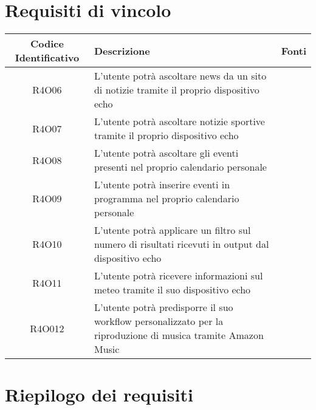 \section{Requisiti di vincolo}
\begin{tabularx}{\textwidth}{|c|X|X|}
	\hline
	\textbf{Codice Identificativo}& \textbf{Descrizione} & \textbf{Fonti}\\
	\hline	
	\endhead
	R4O06 & L'utente potrà ascoltare news da un sito di notizie tramite il proprio dispositivo echo &\\
	\hline
	R4O07 & L'utente potrà ascoltare notizie sportive tramite il proprio dispositivo echo  &\\
	\hline
	R4O08 & L'utente potrà ascoltare gli eventi presenti nel proprio calendario personale  &\\
	\hline
	R4O09 & L'utente potrà inserire eventi in programma nel proprio calendario personale  &\\
	\hline
	R4O10 & L'utente potrà applicare un filtro sul numero di risultati ricevuti in output dal dispositivo echo &\\
	\hline
	R4O11 & L'utente potrà ricevere informazioni sul meteo tramite il suo dispositivo echo&\\
	\hline
	R4O012& L'utente potrà predisporre il suo workflow personalizzato per la riproduzione di musica tramite Amazon Music &\\
	\hline
\end{tabularx}

\section{Riepilogo dei requisiti}